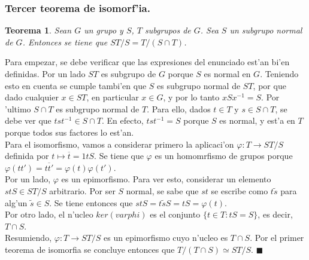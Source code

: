 \documentclass[a4paper,openright,12pt]{book}
\numberwithin{equation}{section} %
\newtheorem{teorema}{Teorema}[section] %
\newenvironment{proof}{\noindent{\it Demostracion:}}{\hfill$\blacksquare$} %
\begin{document}
\subsubsection{Tercer teorema de isomorf'ia.}
\begin{teorema}
Sean $G$ un grupo y $S$, $T$ subgrupos de $G$. Sea $S$ un subgrupo normal de $G$. Entonces se tiene que $ST/S=T/ (S \cap T)$.
\end{teorema}
\begin{proof}
Para empezar, se debe verificar que las expresiones del enunciado est'an bi'en definidas. Por un lado $ST$ es subgrupo de $G$ porque $S$ es normal en $G$. Teniendo esto en cuenta se cumple tambi'en que $S$ es subgrupo normal de $ST$, por que dado cualquier $x \in ST$, en particular $x \in G$, y por lo tanto $xSx^{-1}=S$. Por 'ultimo $S \cap T$ es subgrupo normal de $T$. Para ello, dados $t \in T$ y $s \in S \cap T$, se debe ver que $tst^{-1} \in S \cap T$. En efecto, $tst^{-1}=S$ porque $S$ es normal, y est'a en $T$ porque todos sus factores lo est'an.\\
Para el isomorfismo, vamos a considerar primero la aplicaci'on $\varphi:T \rightarrow ST/S$ definida por $t \mapsto \overline{t}=1tS$. Se tiene que $\varphi$ es un homomrfismo de grupos porque $\varphi(tt')=\overline{tt'}=\varphi(t)\varphi(t')$.\\
Por un lado, $\varphi$ es un epimorfismo. Para ver esto, considerar un elemento $stS \in ST/S$ arbitrario. Por ser $S$ normal, se sabe que $st$ se escribe como $t \widetilde s$ para alg'un $\widetilde s \in S$. Se tiene entonces que $stS=t \widetilde s S=tS=\varphi(t)$.\\
Por otro lado, el n'ucleo $ker (varphi)$ es el conjunto $\{ t \in T:tS=S \}$, es decir, $T \cap S$.\\
Resumiendo, $\varphi:T \rightarrow ST/S$ es un epimorfismo cuyo n'ucleo es $T \cap S$. Por el primer teorema de isomorfia se concluye entonces que $T/(T \cap S) \simeq ST/S$.
\end{proof}
\end{document}
